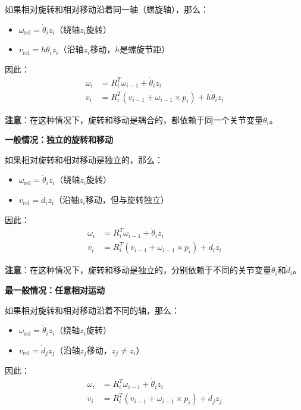 \documentclass[12pt,a4paper]{article}
\begin{document}
如果相对旋转和相对移动沿着同一轴（螺旋轴），那么：
\begin{itemize}
\item $\omega_{\text{rel}} = \dot{\theta}_i z_i$（绕轴$z_i$旋转）
\item $v_{\text{rel}} = h \dot{\theta}_i z_i$（沿轴$z_i$移动，$h$是螺旋节距）
\end{itemize}

因此：
\begin{align}
\omega_i &= R_i^T \omega_{i-1} + \dot{\theta}_i z_i \\
v_i &= R_i^T (v_{i-1} + \omega_{i-1} \times p_i) + h \dot{\theta}_i z_i
\end{align}

\textbf{注意}：在这种情况下，旋转和移动是耦合的，都依赖于同一个关节变量$\dot{\theta}_i$。

\textbf{一般情况：独立的旋转和移动}

如果相对旋转和相对移动是独立的，那么：
\begin{itemize}
\item $\omega_{\text{rel}} = \dot{\theta}_i z_i$（绕轴$z_i$旋转）
\item $v_{\text{rel}} = \dot{d}_i z_i$（沿轴$z_i$移动，但与旋转独立）
\end{itemize}

因此：
\begin{align}
\omega_i &= R_i^T \omega_{i-1} + \dot{\theta}_i z_i \\
v_i &= R_i^T (v_{i-1} + \omega_{i-1} \times p_i) + \dot{d}_i z_i
\end{align}

\textbf{注意}：在这种情况下，旋转和移动是独立的，分别依赖于不同的关节变量$\dot{\theta}_i$和$\dot{d}_i$。

\textbf{最一般情况：任意相对运动}

如果相对旋转和相对移动沿着不同的轴，那么：
\begin{itemize}
\item $\omega_{\text{rel}} = \dot{\theta}_i z_i$（绕轴$z_i$旋转）
\item $v_{\text{rel}} = \dot{d}_j z_j$（沿轴$z_j$移动，$z_j \neq z_i$）
\end{itemize}

因此：
\begin{align}
\omega_i &= R_i^T \omega_{i-1} + \dot{\theta}_i z_i \\
v_i &= R_i^T (v_{i-1} + \omega_{i-1} \times p_i) + \dot{d}_j z_j
\end{align}
\end{document}
